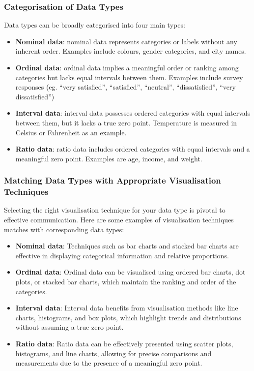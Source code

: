 \documentclass{article}\usepackage[]{graphicx}\usepackage[]{xcolor}
\begin{document}
\subsubsection{Categorisation of Data Types}
Data types can be broadly categorised into four main types: 
\begin{itemize}
    \item \textbf{Nominal data}: nominal data represents categories or labels without any inherent order. Examples include colours, gender categories, and city names. 
    \item \textbf{Ordinal data}: ordinal data implies a meaningful order or ranking among categories but lacks equal intervals between them. Examples include survey responses (eg. “very satisfied”, “satisfied”, “neutral”, “dissatisfied”, “very dissatisfied”)
    \item \textbf{Interval data}: interval data possesses ordered categories with equal intervals between them, but it lacks a true zero point. Temperature is measured in Celsius or Fahrenheit as an example. 
    \item \textbf{Ratio data}: ratio data includes ordered categories with equal intervals and a meaningful zero point. Examples are age, income, and weight. 
\end{itemize}

\subsubsection{Matching Data Types with Appropriate Visualisation Techniques}
Selecting the right visualisation technique for your data type is pivotal to effective communication. Here are some examples of visualisation techniques matches with corresponding data types: 
\begin{itemize}
    \item \textbf{Nominal data}: Techniques such as bar charts and stacked bar charts are effective in displaying categorical information and relative proportions. 
    \item \textbf{Ordinal data}: Ordinal data can be visualised using ordered bar charts, dot plots, or stacked bar charts, which maintain the ranking and order of the categories.
    \item \textbf{Interval data}: Interval data benefits from visualisation methods like line charts, histograms, and box plots, which highlight trends and distributions without assuming a true zero point. 
    \item \textbf{Ratio data}: Ratio data can be effectively presented using scatter plots, histograms, and line charts, allowing for precise comparisons and measurements due to the presence of a meaningful zero point. 
\end{itemize}
\end{document}
